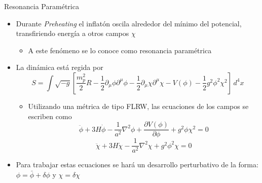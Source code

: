 \documentclass{beamer}
\begin{document}
            \begin{frame}{Resonancia Paramétrica}
                \begin{itemize}
                    \item[\textcolor{brown}{$\bullet$}] Durante \textit{Preheating} el inflatón oscila alrededor del mínimo del potencial, transfiriendo energía a otros campos $\chi$
                    \begin{itemize}
                        \item[\textcolor{cyan}{$\Longrightarrow$}] A este fenómeno se lo conoce como resonancia paramétrica 
                    \end{itemize}
                    \item[\textcolor{brown}{$\bullet$}] La dinámica está regida por
                        \small{\begin{equation*}
                            S = \int \sqrt{-g} \left[ \frac{m_p^2}{2} R - \frac{1}{2} \partial_\mu \phi \partial^\mu \phi - \frac{1}{2} \partial_\mu \chi \partial^\mu \chi - V(\phi) - \frac{1}{2} g^2 \phi^2 \chi^2 \right] \, d^4 x 
                        \end{equation*}}
                    \begin{itemize}
                        \item[\textcolor{cyan}{$\Longrightarrow$}] Utilizando una métrica de tipo FLRW, las ecuaciones de los campos se escriben como
                            \begin{equation*}
                                \ddot{\phi} + 3 H \dot{\phi} - \frac{1}{a^2} \nabla^2 \phi + \frac{\partial V(\phi)}{\partial \phi} + g^2 \phi \chi^2 = 0
                            \end{equation*}
                            \begin{equation*}
                                \ddot{\chi} + 3 H \dot{\chi} - \frac{1}{a^2} \nabla^2 \chi + g^2 \phi^2 \chi = 0
                            \end{equation*}
                    \end{itemize}
                    \item[\textcolor{brown}{$\bullet$}] Para trabajar estas ecuaciones se hará un desarrollo perturbativo de la forma: $\phi = \bar{\phi} + \delta \phi$ y $\chi = \delta \chi$
                \end{itemize}
            \end{frame}
\end{document}
